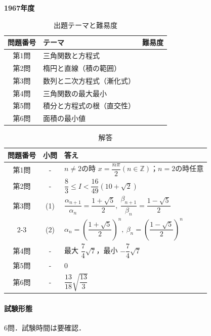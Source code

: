 \documentclass[../../main.tex]{subfiles}
\begin{document}
\begin{center}
  {\fontsize{48pt}{58pt}\selectfont \textbf{1967}\normalsize\textbf{年度}}
\end{center}

\begin{table}[htb]
  \centering
  \caption{出題テーマと難易度}
  \begin{tabular}{|c|p{9cm}|c|}
    \hline
    \textbf{問題番号} & \textbf{テーマ} & \textbf{難易度} \\
    \hline
    第1問 & 三角関数と方程式 & \\
    \hline
    第2問 & 楕円と直線（積の範囲） & \\
    \hline
    第3問 & 数列と二次方程式（漸化式） & \\
    \hline
    第4問 & 三角関数の最大最小 & \\
    \hline
    第5問 & 積分と方程式の根（直交性） & \\
    \hline
    第6問 & 面積の最小値 & \\
    \hline
  \end{tabular}
\end{table}

\begin{table}[htb]
  \centering
  \caption{解答}
  \renewcommand{\arraystretch}{1.4}
  \begin{tabular}{|c|c|p{9cm}|}
    \hline
    \textbf{問題番号} & \textbf{小問} & \textbf{答え} \\
    \hline
    第1問 & - & $n\ne2$の時 $x=\dfrac{n\pi}{2}(n\in\mathbb{Z})$；$n=2$の時任意 \\
    \hline
    第2問 & - & $\dfrac{8}{3} \le I < \dfrac{16}{49}(10+\sqrt{2})$ \\
    \hline
    第3問 & (1) & $\dfrac{\alpha_{n+1}}{\alpha_n}=\dfrac{1+\sqrt{5}}{2},\ \dfrac{\beta_{n+1}}{\beta_n}=\dfrac{1-\sqrt{5}}{2}$ \\
    \cline{2-3}
    & (2) & $\alpha_n=\left(\dfrac{1+\sqrt{5}}{2}\right)^n,\ \beta_n=\left(\dfrac{1-\sqrt{5}}{2}\right)^n$ \\
    \hline
    第4問 & - & 最大 $\dfrac{7}{4}\sqrt{7}$，最小 $-\dfrac{7}{4}\sqrt{7}$ \\
    \hline
    第5問 & - & $0$ \\
    \hline
    第6問 & - & $\dfrac{13}{18}\sqrt{\dfrac{13}{3}}$ \\
    \hline
  \end{tabular}
\end{table}

\paragraph{試験形態}
6問．試験時間は要確認．
\end{document}

